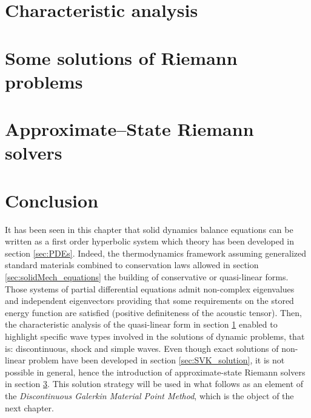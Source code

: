 \section{Characteristic analysis}
\label{sec:characteristic_analysis}


\section{Some solutions of Riemann problems}
\label{sec:riemann_problems}

\section{Approximate--State Riemann solvers}
\label{sec:riemann_solvers}


\section*{Conclusion}
It has been seen in this chapter that solid dynamics balance equations can be written as a first order hyperbolic system which theory has been developed in section \ref{sec:PDEs}. Indeed, the thermodynamics framework assuming generalized standard materials combined to conservation laws allowed in section \ref{sec:solidMech_equations} the building of conservative or quasi-linear forms. Those systems of partial differential equations admit non-complex eigenvalues and independent eigenvectors providing that some requirements on the stored energy function are satisfied (positive definiteness of the acoustic tensor). Then, the characteristic analysis of the quasi-linear form in section \ref{sec:characteristic_analysis} enabled to highlight specific wave types involved in the solutions of dynamic problems, that is: discontinuous, shock and simple waves. Even though exact solutions of non-linear problem have been developed in section \ref{sec:SVK_solution}, it is not possible in general, hence the introduction of approximate-state Riemann solvers in section \ref{sec:riemann_solvers}. This solution strategy will be used in what follows as an element of the \textit{Discontinuous Galerkin Material Point Method}, which is the object of the next chapter.

